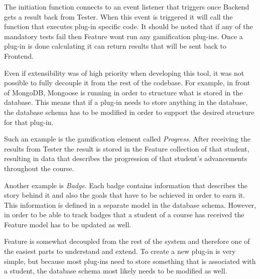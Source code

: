 The initiation function connects to an event listener that triggers once Backend
gets a result back from Tester. When this event is triggered it will call the
function that executes plug-in specific code. It should be noted that if any of the mandatory tests fail then Feature wont run any gamification plug-ins. Once a plug-in is done calculating it can return results that will be sent back to Frontend.

Even if extensibility was of high priority when developing this tool, it was not
possible to fully decouple it from the rest of the codebase. For example, in front of MongoDB, Mongoose is running in order to structure what is stored in the database. This means that if a plug-in needs to store anything in the database, the database schema has to be modified in order to support the desired structure for that plug-in.

Such an example is the gamification element called \emph{Progress}. After
receiving the results from Tester the result is stored in the Feature collection
of that student, resulting in data that describes the progression of that student's advancements throughout the course.

Another example is \emph{Badge}. Each badge contains information that describes the story behind it and also the goals that have to be achieved in order to earn it. This information is defined in a separate model in the database schema. However, in order to be able to track badges that a student of a course has received the Feature model has to be updated as well.

Feature is somewhat decoupled from the rest of the system and therefore one of the easiest parts to understand and extend. To create a new plug-in is very simple, but because most plug-ins need to store something that is associated with a student, the database schema most likely needs to be modified as well.
